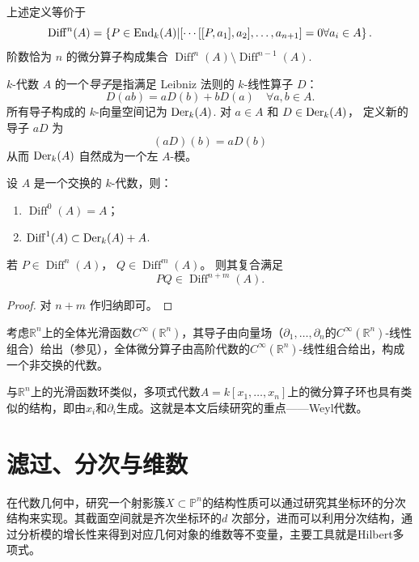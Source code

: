 \documentclass[12pt,a4paper]{ctexrep}   %
\begin{document}
\begin{remark}
    上述定义等价于
    \[
        \operatorname{Diff}^n(A)
        =
        \left\{
        P \in \operatorname{End}_k(A)
        |
        [\cdots[[P,a_1],a_2],\ldots,a_{n+1}] = 0
        \forall a_i \in A
        \right\}.
    \]
    阶数恰为 $n$ 的微分算子构成集合
    $\operatorname{Diff}^n(A)\setminus \operatorname{Diff}^{n-1}(A)$.
\end{remark}


\begin{definition}
    $k$-代数 $A$ 的一个\emph{导子}是指满足 Leibniz 法则的
    $k$-线性算子 $D$：
    \[
        D(ab)=aD(b)+bD(a)
        \quad \forall a,b\in A.
    \]
    所有导子构成的 $k$-向量空间记为 $\operatorname{Der}_k(A)$.
    对 $a \in A$ 和 $D \in \operatorname{Der}_k(A)$，
    定义新的导子 $aD$ 为
    \[
        (aD)(b)=aD(b)
    \]
    从而 $\operatorname{Der}_k(A)$ 自然成为一个左 $A$-模。
\end{definition}

\begin{proposition}
    设 $A$ 是一个交换的 $k$-代数，则：
    \begin{enumerate}[label=(\arabic*)]
        \item $\operatorname{Diff}^0(A)=A$；
        \item $\operatorname{Diff}^1(A)\subset \operatorname{Der}_k(A)+A$.
    \end{enumerate}
\end{proposition}

\begin{proposition}
    若 $P \in \operatorname{Diff}^n(A)$，
    $Q \in \operatorname{Diff}^m(A)$。
    则其复合满足
    \[
        PQ \in \operatorname{Diff}^{n+m}(A).
    \]
    \begin{proof}
        对 $n+m$ 作归纳即可。
    \end{proof}
\end{proposition}

\begin{example}
    考虑$\mathbb{R}^n$上的全体光滑函数$C^\infty(\mathbb{R}^n)$，其导子由向量场（$\partial_1,\ldots,\partial_n$的$C^\infty(\mathbb{R}^n)$-线性组合）给出（参见\cite{boothby2003introduction}），全体微分算子由高阶代数的$C^\infty(\mathbb{R}^n)$-线性组合给出，构成一个非交换的代数。
\end{example}
与$\mathbb{R}^n$上的光滑函数环类似，多项式代数$A=k[x_1,\ldots,x_n]$上的微分算子环也具有类似的结构，即由$x_i$和$\partial_i$生成。这就是本文后续研究的重点——Weyl代数。



\section{滤过、分次与维数}
在代数几何中，研究一个射影簇$X\subset \mathbb{P}^n$的结构性质可以通过研究其坐标环的分次结构来实现。其截面空间就是齐次坐标环的$d$ 次部分，进而可以利用分次结构，通过分析模的增长性来得到对应几何对象的维数等不变量，主要工具就是Hilbert多项式。
\end{document}
